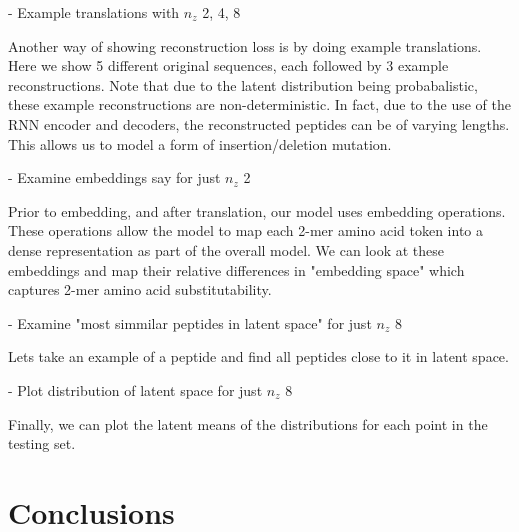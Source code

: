 \documentclass[preprint,12pt]{elsarticle}
\begin{document}
- Example translations with $n_z$ 2, 4, 8

Another way of showing reconstruction loss is by doing example translations. Here we show 5 different original sequences, each followed by 3 example reconstructions. Note that due to the latent distribution being probabalistic, these example reconstructions are non-deterministic. In fact, due to the use of the RNN encoder and decoders, the reconstructed peptides can be of varying lengths. This allows us to model a form of insertion/deletion mutation.

- Examine embeddings say for just $n_z$ 2

Prior to embedding, and after translation, our model uses embedding operations. These operations allow the model to map each 2-mer amino acid token into a dense representation as part of the overall model. We can look at these embeddings and map their relative differences in "embedding space" which captures 2-mer amino acid substitutability.

- Examine "most simmilar peptides in latent space" for just $n_z$ 8

Lets take an example of a peptide and find all peptides close to it in latent space.

- Plot distribution of latent space for just $n_z$ 8

Finally, we can plot the latent means of the distributions for each point in the testing set.

\section{Conclusions}










\end{document}
